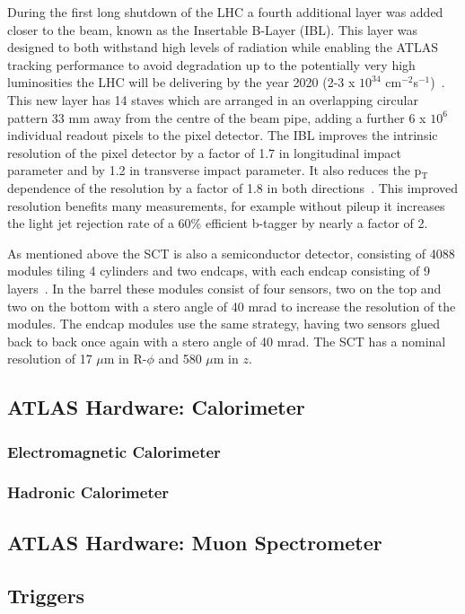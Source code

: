 During the first long shutdown of the LHC a fourth additional layer was added closer to the beam, known as the Insertable B-Layer (IBL).  
This layer was designed to both withstand high levels of radiation while enabling the ATLAS tracking performance to avoid degradation up to the potentially very high luminosities the LHC will be delivering by the year 2020 (2-3 x $10^{34}$ cm$^{-2}$s$^{-1}$)~\cite{IBL1}.  
This new layer has 14 staves which are arranged in an overlapping circular pattern 33 mm away from the centre of the beam pipe, adding a further 6 x $10^{6}$ individual readout pixels to the pixel detector.  
The IBL improves the intrinsic resolution of the pixel detector by a factor of 1.7 in longitudinal impact parameter and by 1.2 in transverse impact parameter.  
It also reduces the p$_{\mathrm{T}}$ dependence of the resolution by a factor of 1.8 in both directions~\cite{IBL2}.  
This improved resolution benefits many measurements, for example without pileup it increases the light jet rejection rate of a 60\% efficient b-tagger by nearly a factor of 2.  

As mentioned above the SCT is also a semiconductor detector, consisting of 4088 modules tiling 4 cylinders and two endcaps, with each endcap consisting of 9 layers~\cite{JOIATLAS}.  
In the barrel these modules consist of four sensors, two on the top and two on the bottom with a stero angle of 40 mrad to increase the resolution of the modules.  
The endcap modules use the same strategy, having two sensors glued back to back once again with a stero angle of 40 mrad.  
The SCT has a nominal resolution of 17 $\mu$m in R-$\phi$ and 580 $\mu$m in $z$.  

 



\subsection{ATLAS Hardware: Calorimeter}

\subsubsection{Electromagnetic Calorimeter}
\label{EMCalo} 

\subsubsection{Hadronic Calorimeter}
\label{Had}

\subsection{ATLAS Hardware: Muon Spectrometer}

\subsection{Triggers}
\label{Trig}
